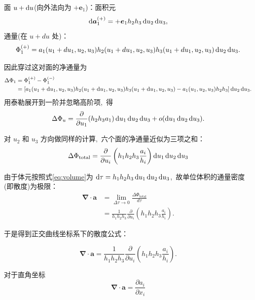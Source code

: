    面 \(u+\dif u\)(向外法向为 \(+{\boldsymbol e}_1\))：面积元
  \[
  \dif\boldsymbol a_{1}^{(+)} = +{\boldsymbol e}_1h_2 h_3\dif u_2\dif u_3,
  \]
  通量(在 \(u+du\) 处)：
  \[
  \Phi_1^{(+)} = a_1(u_1+du_1,u_2,u_3)h_2(u_1+du_1,u_2,u_3)h_3(u_1+du_1,u_2,u_3)\dif u_2\dif u_3.
  \]

因此穿过这对面的净通量为
\begin{align*}
    \Delta\Phi_1 &= \Phi_1^{(+)}-\Phi_1^{(-)}\\
&= \left[ a_1(u_1+\dif u_1,u_2,u_3)h_2(u_1+\dif u_1,u_2,u_3)h_3(u_1+\dif u_1,u_2,u_3) - a_1(u_1,u_2,u_3)h_2 h_3 \right] \dif u_2\dif u_3.
\end{align*}
用泰勒展开到一阶并忽略高阶项, \,得
\[
\Delta\Phi_u = \frac{\partial}{\partial u_1}( h_2 h_3 a_1 )\dif u_1\dif u_2\dif u_3 + o(\dif u_1\dif u_2\dif u_3).
\]

对 \(u_2\) 和 \(u_3\) 方向做同样的计算, \,六个面的净通量近似为三项之和：
\[
\Delta\Phi_{\text{total}} =
\frac{\partial}{\partial u_i}\left( h_1h_2 h_3 \frac{a_i}{h_i} \right)\dif u_1\dif u_2\dif u_3
\]


由于体元按照式\eqref{eq:volume}为 \(\dif\tau = h_1 h_2 h_3\dif u_1\dif u_2\dif u_3\), \,故单位体积的通量密度(即散度)为极限：
\[
\begin{aligned}
\boldsymbol\nabla\cdot\boldsymbol a
&= \lim_{\Delta\tau\to 0}\frac{\Delta\Phi_{\text{total}}}{d\tau} \\
&=\frac{1}{h_1 h_2 h_3}\frac{\partial}{\partial u_i}\left(h_1 h_2 h_3\frac{a_i}{h_i}
\right).
\end{aligned}
\]

于是得到正交曲线坐标系下的散度公式：

\begin{equation}\label{eq:div-general}
\boldsymbol\nabla\cdot\boldsymbol a
=\frac{1}{h_1 h_2 h_3}\frac{\partial}{\partial u_i}\left(h_1 h_2 h_3\frac{a_i}{h_i}
\right).
\end{equation}

对于直角坐标
\begin{equation}
    \boldsymbol\nabla\cdot\boldsymbol a = \frac{\partial a_i}{\partial x_i} 
\end{equation}




